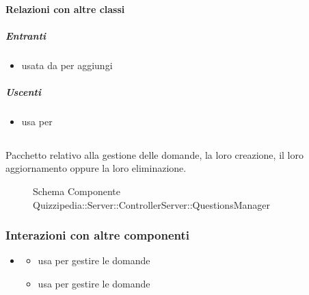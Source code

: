 \paragraph{Relazioni con altre classi}
\subparagraph{Entranti}
\begin{itemize}
\item usata da  per aggiungi
\end{itemize}
\subparagraph{Uscenti}
\begin{itemize}
\item usa  per 
\end{itemize}
\subsection{}
Pacchetto relativo alla gestione delle domande, la loro creazione, il loro aggiornamento oppure la loro eliminazione.
\begin{figure}[H]
\centering
\noindent{}
\caption[Schema Componente Quizzipedia::Server::ControllerServer::QuestionsManager]{Schema Componente Quizzipedia::Server::ControllerServer::QuestionsManager}
\end{figure}
\subsubsection{Interazioni con altre componenti}
\begin{itemize}
\item {}
\begin{itemize}
\item usa  per gestire le domande
\item usa  per gestire le domande
\end{itemize}
\end{itemize}
